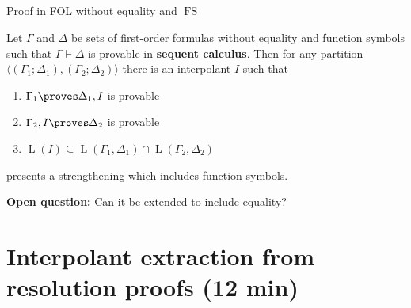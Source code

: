 \documentclass[final,compress]{beamer}
\DeclareMathOperator{\Lang}{L}
\begin{document}
\subsection{}
\begin{frame}{Proof in FOL without equality and $\operatorname{FS}$}


	\begin{lemma}[Maehara]
		Let $\Gamma$ and $\Delta$ be sets of first-order formulas without equality and function symbols   such that $\Gamma \vdash \Delta$ is provable in \textbf{sequent calculus}.
		Then for any partition $\langle(\Gamma_1;\Delta_1),(\Gamma_2;\Delta_2)\rangle$
		there is an interpolant $I$ such that
		\begin{enumerate}
			\item $\Gamma_1 \proves \Delta_1, I$ is provable
			\item $\Gamma_2, I \proves \Delta_2$ is provable
			\item $\Lang(I) \subseteq \Lang(\Gamma_1, \Delta_1) \cap \Lang(\Gamma_2, \Delta_2)$
		\end{enumerate}
	\end{lemma}

	\pause
	\cite{baaz2011methods} presents a strengthening which includes function symbols.

	\textbf{Open question:} Can it be extended to include equality?
\end{frame}

\section{Interpolant extraction from resolution proofs (12 min)}
\end{document}
